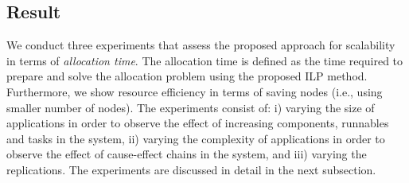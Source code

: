 \subsection{Result}
We conduct three experiments that assess the proposed approach for scalability in terms of \textit{allocation time}. The allocation time is defined as the time required to prepare and solve the allocation problem using the proposed ILP method. Furthermore, we show resource efficiency in terms of saving nodes (i.e., using smaller number of nodes). The experiments consist of: i) varying the size of applications in order to observe the effect of increasing components, runnables and tasks in the system, ii) varying the complexity of applications in order to observe the effect of cause-effect chains in the system, and iii) varying the replications. The experiments are discussed in detail in the next subsection.

